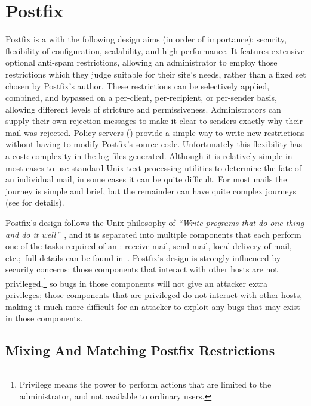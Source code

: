 \section{Postfix}

\label{postfix background}

Postfix is a  with the following design aims (in order of
importance): security, flexibility of configuration, scalability, and high
performance.  It features extensive optional anti-spam restrictions,
allowing an administrator to employ those restrictions which they judge
suitable for their site's needs, rather than a fixed set chosen by
Postfix's author.  These restrictions can be selectively applied, combined,
and bypassed on a per-client, per-recipient, or per-sender basis, allowing
different levels of stricture and permissiveness.  Administrators can
supply their own rejection messages to make it clear to senders exactly why
their mail was rejected.  Policy servers ()
provide a simple way to write new restrictions without having to modify
Postfix's source code.  Unfortunately this flexibility has a cost:
complexity in the log files generated.  Although it is relatively simple in
most cases to use standard Unix text processing utilities to determine the
fate of an individual mail, in some cases it can be quite difficult.  For
most mails the journey is simple and brief, but the remainder can have
quite complex journeys (see  for details).

Postfix's design follows the Unix philosophy of \textit{``Write programs
that do one thing and do it well''\/}~\cite{unix-philosophy}, and it is
separated into multiple components that each perform one of the tasks
required of an \@: receive mail, send mail, local delivery of
mail, etc.;\ full details can be found in~\cite{postfix-overview}.
Postfix's design is strongly influenced by security concerns: those
components that interact with other hosts are not
privileged,\footnote{Privilege means the power to perform actions that are
limited to the administrator, and not available to ordinary users.} so bugs
in those components will not give an attacker extra privileges; those
components that are privileged do not interact with other hosts, making it
much more difficult for an attacker to exploit any bugs that may exist in
those components.

\subsection{Mixing And Matching Postfix Restrictions}

